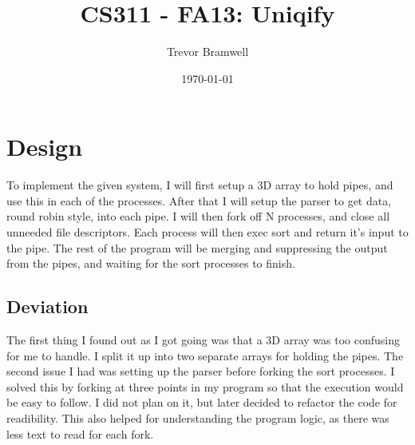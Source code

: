 \documentclass[letterpaper,10pt]{article}
\title{CS311 - FA13: Uniqify}
\date{\today}
\author{Trevor Bramwell}
\begin{document}
\maketitle

\section{Design}

To implement the given system, I will first setup a 3D array to hold
pipes, and use this in each of the processes. After that I will setup
the parser to get data, round robin style, into each pipe. I will then
fork off N processes, and close all unneeded file descriptors. Each
process will then exec sort and return it's input to the pipe. The rest
of the program will be merging and suppressing the output from the
pipes, and waiting for the sort processes to finish.

\subsection{Deviation}

The first thing I found out as I got going was that a 3D array was too
confusing for me to handle. I split it up into two separate arrays for
holding the pipes. The second issue I had was setting up the parser
before forking the sort processes. I solved this by forking at three
points in my program so that the execution would be easy to follow. I
did not plan on it, but later decided to refactor the code for
readibility. This also helped for understanding the program logic, as
there was less text to read for each fork.
\end{document}
